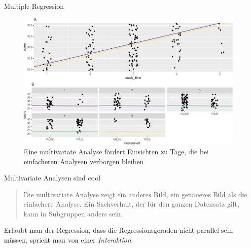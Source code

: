 \begin{frame}{Multiple Regression}

\begin{figure}

{\centering \includegraphics[width=0.8\linewidth]{PraDa_Folien_nm_2_files/figure-beamer/no-interakt-1} 

}

\caption{Eine multivariate Analyse fördert Einsichten zu Tage, die bei einfacheren Analysen verborgen bleiben}\label{fig:no-interakt}
\end{figure}

\end{frame}

\begin{frame}{Multivariate Analysen sind cool}

\begin{quote}
Die multivariate Analyse zeigt ein anderes Bild, ein genaueres Bild als
die einfachere Analyse. Ein Sachverhalt, der für den ganzen Datensatz
gilt, kann in Subgruppen anders sein.
\end{quote}

Erlaubt man der Regression, dass die Regressionsgeraden nicht parallel
sein müssen, spricht man von einer \emph{Interaktion}.

\end{frame}

